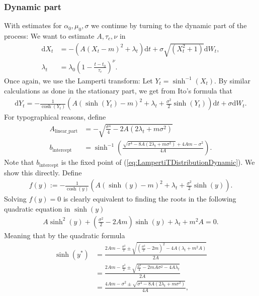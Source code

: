 \subsubsection{Dynamic part}
With estimates for $\alpha_0, \mu_0, \sigma$ we continue by turning to the dynamic part of the process: We want to estimate $A, \tau_c, \nu$ in
\begin{align}
    \mathrm{d}X_t &= -\left(A(X_t - m)^2 + \lambda_t\right)\mathrm{d}t + \sigma \sqrt{\left(X_t^2 + 1\right)}\mathrm{d}W_t,\\
    \lambda_t &= \lambda_0 \left(1 - \frac{t - t_0}{\tau_c}\right)^\nu.
\end{align}
Once again, we use the Lamperti transform: Let $Y_t = \sinh^{-1}(X_t)$. By similar calculations as done in the stationary part, we get from Ito's formula that
\begin{align}
    \mathrm{d}Y_t = -\frac{1}{\cosh(Y_t)}\left(A\left(\sinh(Y_t) - m\right)^2 + \lambda_t + \frac{\sigma^2}{2}\sinh(Y_t)\right)\mathrm{d}t + \sigma \mathrm{d}W_t. \label{eq:LampertiTDistributionDynamic}
\end{align}
For typographical reasons, define
\begin{align}
    A_{\textrm{linear\_part}} &= -\sqrt{\frac{\sigma^4}{4} - 2A\left(2\lambda_t + m\sigma^2\right)}\\
    b_{\textrm{intercept}} &= \sinh^{-1}\left(\frac{\sqrt{\sigma^4 - 8A\left(2\lambda_t + m \sigma^2\right)} + 4 Am - \sigma^2}{4A}\right).
\end{align}
Note that $b_{\textrm{intercept}}$ is the fixed point of (\ref{eq:LampertiTDistributionDynamic}). We show this directly. Define
\begin{align}
    f(y) := -\frac{1}{\cosh(y)}\left(A\left(\sinh(y) - m\right)^2 + \lambda_t + \frac{\sigma^2}{2}\sinh(y)\right).
\end{align}
Solving $f(y) = 0$ is clearly equivalent to finding the roots in the following quadratic equation in $\sinh(y)$
\begin{align}
    A\sinh^2(y) + \left(\frac{\sigma^2}{2} - 2Am\right)\sinh(y) + \lambda_t + m^2A = 0.
\end{align}
Meaning that by the quadratic formula
\begin{align}
    \sinh(y^*) &= \frac{2Am-\frac{\sigma^2}{2}\pm\sqrt{\left(\frac{\sigma^2}{2} - 2m\right)^2 - 4A\left(\lambda_t + m^2 A\right)}}{2A}\nonumber\\
    &= \frac{2Am-\frac{\sigma^2}{2}\pm\sqrt{\frac{\sigma^4}{4}-2mA\sigma^2 - 4A\lambda_t}}{2A}\nonumber\\
    &= \frac{4Am-\sigma^2\pm\sqrt{\sigma^4-8A\left(2\lambda_t + m\sigma^2\right)}}{4A},
\end{align}
